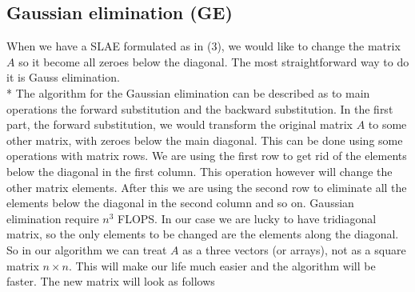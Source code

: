 \documentclass[10pt]{article}
\begin{document}
\subsection{Gaussian elimination (GE)} 
When we have a SLAE formulated as in (3), we would like to change the matrix $ A $ so it become all zeroes below the diagonal. The most straightforward way to do it is Gauss elimination. \\*
The algorithm for the Gaussian elimination can be described as to main operations the forward substitution and the backward substitution. In the first part, the forward substitution, we would transform the original matrix $ A $ to some other matrix, with zeroes below the main diagonal. This can be done using some operations with matrix rows. We are using the first row to get rid of the elements below the diagonal in the first column. This operation however will change the other matrix elements. After this we are using the second row to eliminate all the elements below the diagonal in the second column and so on. Gaussian elimination require $ n^{3} $ FLOPS. In our case we are lucky to have tridiagonal matrix, so the only elements to be changed are the elements along the diagonal. So in our algorithm we can treat $ A $ as a three vectors (or arrays), not as a square matrix $ n\times n $. This will make our life much easier and the algorithm will be faster.
The new matrix will look as follows 
\end{document}
